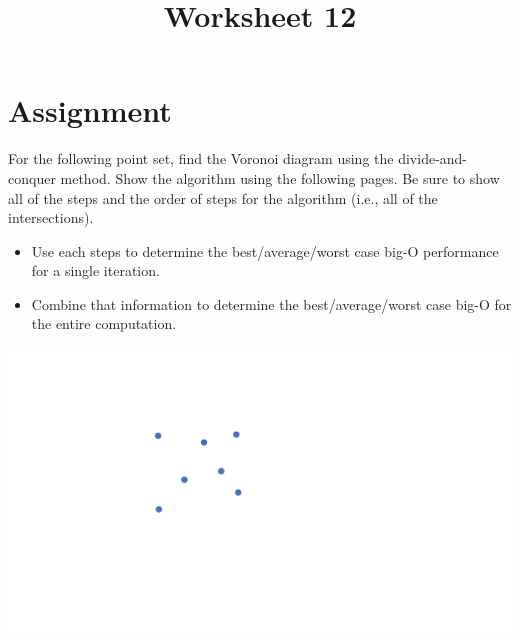\documentclass[a4paper,12pt]{article}
\title{Worksheet 12}
\begin{document}
\maketitle

\worksheetGroundRules

\worksheetSubmission



\vspace{5pt}
\section{Assignment}

For the following point set, find the Voronoi diagram using the divide-and-conquer method. Show the algorithm using the following pages. Be sure to show all of the steps and the order of steps for the algorithm (i.e., all of the intersections).


\begin{itemize}

\item Use each steps to determine the best/average/worst case big-O performance for a single iteration. 
\item Combine that information to determine the best/average/worst case big-O for the entire computation.

\end{itemize}



\begin{center}
\includegraphics[width=0.65\linewidth]{../images/voronoi7.pdf}
\end{center}




\newpage
\end{document}
